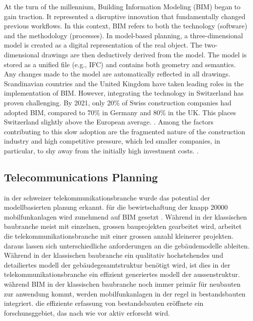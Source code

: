 \begin{English}
    At the turn of the millennium, Building Information Modeling (BIM) began to gain traction. It represented a disruptive innovation that fundamentally changed previous workflows. In this context, BIM refers to both the technology (software) and the methodology (processes). In model-based planning, a three-dimensional model is created as a digital representation of the real object. The two-dimensional drawings are then deductively derived from the model. The model is stored as a unified file (e.g., IFC) and contains both geometry and semantics. Any changes made to the model are automatically reflected in all drawings. \\
    Scandinavian countries and the United Kingdom have taken leading roles in the implementation of BIM. However, integrating the technology in Switzerland has proven challenging. By 2021, only 20\% of Swiss construction companies had adopted BIM, compared to 70\% in Germany and 80\% in the UK. This places Switzerland slightly above the European average. \cite{heinrichSchweizImBIMEuropavergleich2022}. Among the factors contributing to this slow adoption are the fragmented nature of the construction industry and high competitive pressure, which led smaller companies, in particular, to shy away from the initially high investment costs. \cite{ivanicErfolgreicheEinfuehrungBuilding2020}. \
\end{English}

\subsection{Telecommunications Planning}
\begin{German}
    in der schweizer telekommunikationsbranche wurde das potential der modellbasierten planung erkannt. für die bewirtschaftung der knapp 20000 mobilfunkanlagen wird zunehmend auf BIM gesetzt \cite{federalofficeofcommunicationsofcomLocationsMobilePhone}. Während in der klassischen baubranche meist mit einzelnen, grossen bauprojekten gearbeitet wird, arbeitet die telekommunikationsbranche mit einer grossen anzahl kleinerer projekten. daraus lassen sich unterschiedliche anforderungen an die gebäudemodelle ableiten. Während in der klassischen baubranche ein qualitativ hochstehendes und detailiertes modell der gebäudegesamtstruktur benötigt wird, ist dies in der telekommunikationsbranche ein effizient generiertes modell der aussenstruktur. während BIM in der klassischen baubranche noch immer primär für neubauten zur anwendung kommt, werden mobilfunkanlagen in der regel in bestandsbauten integriert. die effiziente erfassung von bestandsbauten eröffnete ein forschunsggebiet, das nach wie vor aktiv erforscht wird.\\
\end{German}

